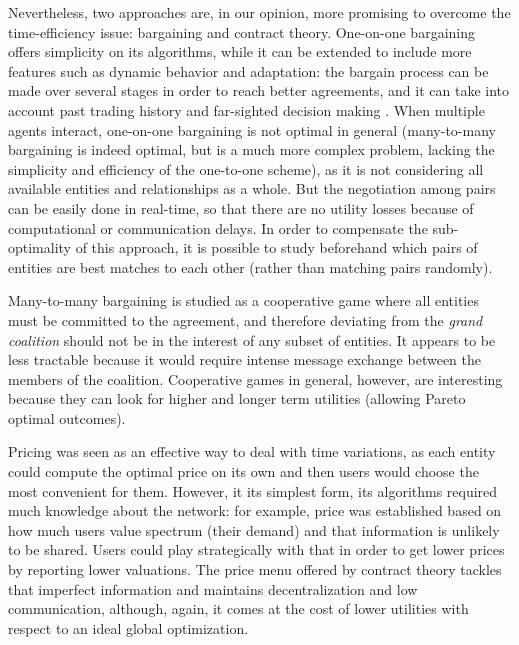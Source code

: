 Nevertheless, two approaches are, in our opinion, more promising to overcome the time-efficiency issue: bargaining and contract theory. 
One-on-one bargaining offers simplicity on its algorithms, while it can be extended to include more features such as dynamic behavior and adaptation: the bargain process can be made over several stages in order to reach better agreements, and it can take into account past trading history and far-sighted decision making \cite{ref:Yan2011}. 
When multiple agents interact, one-on-one bargaining is not optimal in general (many-to-many bargaining is indeed optimal, but is a much more complex problem, lacking the simplicity and efficiency of the one-to-one scheme), as it is not considering all available entities and relationships as a whole. 
But the negotiation among pairs can be easily done in real-time, so that there are no utility losses because of computational or communication delays. 
In order to compensate the sub-optimality of this approach, it is possible to study beforehand which pairs of entities are best matches to each other (rather than matching pairs randomly).
  
Many-to-many bargaining is studied as a cooperative game where all entities must be committed to the agreement, and therefore deviating from the \textit{grand coalition} should not be in the interest of any subset of entities. 
It appears to be less tractable because it would require intense message exchange between the members of the coalition.
Cooperative games in general, however, are interesting because they can look for higher and longer term utilities (allowing Pareto optimal outcomes). 
	
Pricing was seen as an effective way to deal with time variations, as each entity could compute the optimal price on its own and then users would choose the most convenient for them. 
However, it its simplest form, its algorithms required much knowledge about the network: for example, price was established based on how much users value spectrum (their demand) and that information is unlikely to be shared. 
Users could play strategically with that in order to get lower prices by reporting lower valuations. The price menu offered by contract theory tackles that imperfect information and maintains decentralization and low communication, although, again, it comes at the cost of lower utilities with respect to an ideal global optimization. 

